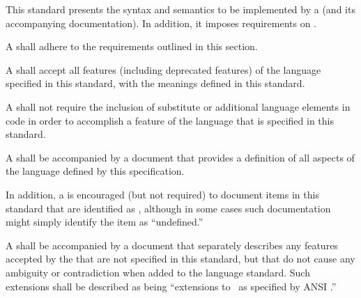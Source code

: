 
This standard presents the syntax and semantics to be implemented by a
 (and its accompanying documentation).
In addition, it imposes requirements on .

 
A  shall adhere to the requirements outlined
in this section.


A  shall accept all features 
(including deprecated features)
of the language specified in this standard,
with the meanings defined in this standard.

A  shall not require the inclusion of substitute
or additional language elements in code in order to accomplish a feature of
the language that is specified in this standard.

\endsubsubsection%


A  shall be accompanied by a document
that provides a definition of all 
aspects of the language defined by this specification.

In addition, a  is encouraged (but not required) 
to document items in this standard that are identified as
, although in some cases
such documentation might simply identify the item as ``undefined.''

\endsubsubsection%


A  shall be accompanied by a
document that separately describes any features accepted by the
 that are not specified in this standard, but that do not
cause any ambiguity or contradiction when added to the language
standard.  Such extensions shall be described as being ``extensions to
\clisp\ as specified by ANSI .''
 
\endsubsubsection%

